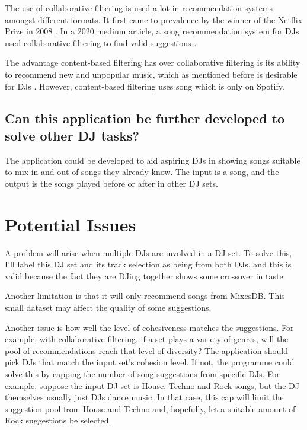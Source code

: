 \documentclass[11pt,titlepage,oneside]{book}
\begin{document}
	The use of collaborative filtering is used a lot in recommendation systems amongst different formats. It first came to prevalence by the winner of the Netflix Prize in 2008 \citep{zhou_large-scale_2008}. In a 2020 medium article, a song recommendation system for DJs used collaborative filtering to find valid suggestions \citep{chow_music_2020}.
	
	\begin{flushleft}
		The advantage content-based filtering has over collaborative filtering is its ability to recommend new and unpopular music, which as mentioned before is desirable for DJs  \citep{van_den_oord_deep_2013}. However, content-based filtering uses song which is only on Spotify.
	\end{flushleft}
	
	
	\subsection{Can this application be further developed to solve other DJ tasks?}
	The application could be developed to aid aspiring DJs in showing songs suitable to mix in and out of songs they already know. The input is a song, and the output is the songs played before or after in other DJ sets.
	
\section{Potential Issues}
A problem will arise when multiple DJs are involved in a DJ set. To solve this, I'll label this DJ set and its track selection as being from both DJs, and this is valid because the fact they are DJing together shows some crossover in taste.

\begin{flushleft}
	Another limitation is that it will only recommend songs from MixesDB. This small dataset may affect the quality of some suggestions.
\end{flushleft}

\begin{flushleft}
	Another issue is how well the level of cohesiveness matches the suggestions. For example, with collaborative filtering. if a set plays a variety of genres, will the pool of recommendations reach that level of diversity? The application should pick DJs that match the input set's cohesion level. If not, the programme could solve this by capping the number of song suggestions from specific DJs. For example, suppose the input DJ set is House, Techno and Rock songs, but the DJ themselves usually just DJs dance music. In that case, this cap will limit the suggestion pool from House and Techno and, hopefully, let a suitable amount of Rock suggestions be selected. 
\end{flushleft}
\end{document}
